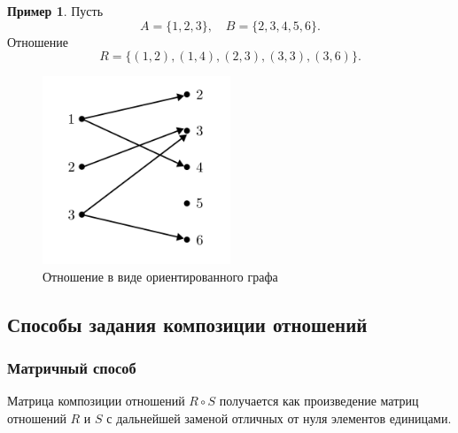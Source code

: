 \documentclass[a5paper, 11pt]{extarticle}
\theoremstyle{definition}
\newtheorem*{example*}{Пример}
\theoremstyle{definition}
\theoremstyle{definition}
\numberwithin{figure}{section}
\numberwithin{table}{section}
\begin{document}
\begin{example*}
    Пусть
    \[
        A = \{1, 2, 3\},
        \quad
        B = \{2, 3, 4, 5, 6\}.
    \]
    Отношение
    \[
        R = \{(1, 2), (1, 4), (2, 3), (3, 3), (3, 6)\}.
    \]
    \begin{figure}[H]
        \centering
        \includegraphics[width=0.5\textwidth]{images/relation-graph.png}
        \caption{Отношение в виде ориентированного графа}
    \end{figure}
\end{example*}

\subsection{Способы задания композиции отношений}

\subsubsection{Матричный способ}

Матрица композиции отношений \(R \circ S\) получается как произведение матриц отношений \(R\) и \(S\) с дальнейшей заменой отличных от нуля элементов единицами.
\end{document}
